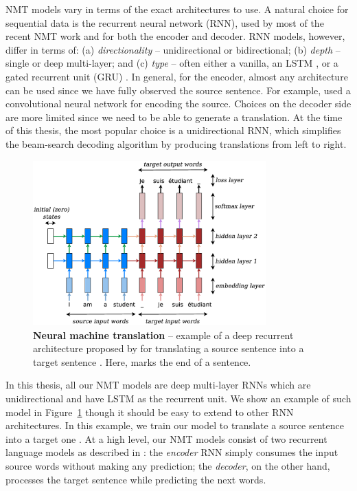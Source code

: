 NMT models vary in terms of the exact architectures to use.
A natural choice for sequential data is the recurrent
neural network (RNN), used by most of the recent NMT work and for both the
encoder and decoder.
RNN models, however, differ in terms of: (a) {\it directionality} -- unidirectional
or bidirectional; (b) {\it depth} -- single or deep multi-layer; and (c) {\it
type} -- often either a vanilla, an LSTM 
\cite{lstm97}, or a gated recurrent unit (GRU) \cite{cho14}.
In general, for the encoder, almost any architecture can be used since we have
fully observed the source sentence. 
For example,  used a convolutional neural network for encoding the source.
Choices on the decoder side are more limited since we need to be able
to generate a translation. At the time of this thesis, the most popular choice is a
unidirectional RNN, which simplifies the beam-search decoding algorithm by
producing translations from left to right.

\begin{figure}[tbh!]
\centering
\includegraphics[width=0.8\textwidth, clip=true, trim= 0 0 0
0]{img/nmt_very_details.eps} %
\caption[Neural machine translation]{{\bf Neural machine translation} -- example of a deep recurrent
architecture proposed by  for
translating a source sentence  into a target sentence
. Here, \word{\texttt{\_}} marks the end of a sentence.
} 
\label{f:nmt_details}
\end{figure}

In this thesis, all our NMT models are deep multi-layer RNNs which are 
unidirectional and have LSTM as the recurrent unit. We show an example of
such model in Figure~\ref{f:nmt_details} though it should be easy to extend to
other RNN architectures. In this example, we train our model to translate a source sentence
 into a target one .
At a high level, our NMT models consist of two recurrent language models as
described in : the {\it encoder} RNN simply consumes the input
source words without making any prediction; the {\it decoder}, on the other
hand, processes
the target sentence while predicting the next words. 

